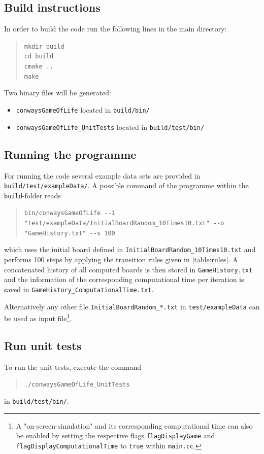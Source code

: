 \subsection{Build instructions}
In order to build the code run the following lines in the main directory:
\begin{quote}
	\texttt{mkdir build}\\
	\texttt{cd build}\\
	\texttt{cmake ..}\\
	\texttt{make}
\end{quote}
Two binary files will be generated:
\begin{itemize}
	\item \texttt{conwaysGameOfLife} located in \texttt{build/bin/}
	\item \texttt{conwaysGameOfLife\_UnitTests} located in \texttt{build/test/bin/}
\end{itemize}


\subsection{Running the programme}
For running the code several example data sets are provided in \texttt{build/test/exampleData/}.
A possible command of the programme within the \texttt{build}-folder reads
\begin{quote}
	\texttt{bin/conwaysGameOfLife -{}-i "test/exampleData/InitialBoardRandom\_10Times10.txt" -{}-o "GameHistory.txt" -{}-s 100}
\end{quote}
which uses the initial board defined in \texttt{InitialBoardRandom\_10Times10.txt} and performs 100 steps by applying the transition rules given in \cref{table:rules}. A concatenated history of all computed boards is then stored in \texttt{GameHistory.txt} and the information of the corresponding computational time per iteration is saved in \texttt{GameHistory\_ComputationalTime.txt}.

Alternatively any other file \texttt{InitialBoardRandom\_*.txt} in \texttt{test/exampleData} can be used as input file\footnote{A "on-screen-simulation" and its corresponding computational time can also be enabled by setting the respective flags \texttt{flagDisplayGame} and \texttt{flagDisplayComputationalTime} to \texttt{true} within \texttt{main.cc}.}.

\subsection{Run unit tests}
To run the unit tests, execute the command
\begin{quote}
	\texttt{./conwaysGameOfLife\_UnitTests}
\end{quote}
in \texttt{build/test/bin/}.


